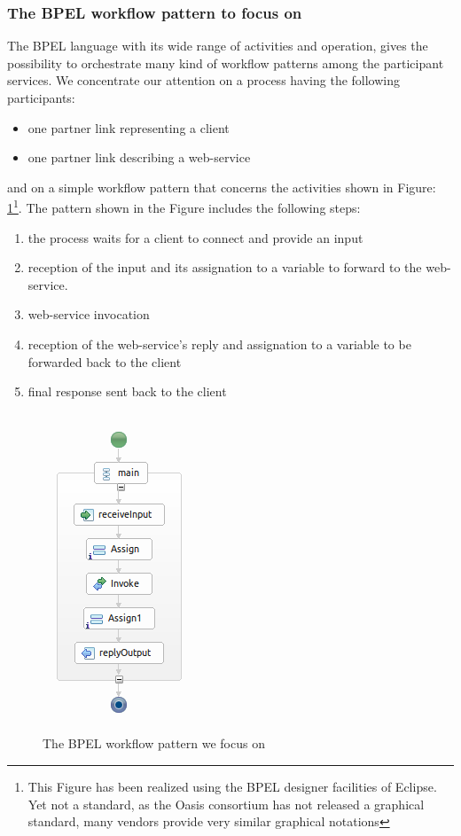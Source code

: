 \subsubsection{The BPEL workflow pattern to focus on}
\label{sec:DesignBPELPattern}
The BPEL language with its wide range of activities and operation, gives the possibility to orchestrate many kind of workflow patterns among the participant services. We concentrate our attention on a process having the following participants:
\begin{itemize}
 \item one partner link representing a client
 \item one partner link describing a web-service
\end{itemize}
and on a simple workflow pattern that concerns the activities shown in Figure: \ref{fig:BPELWorkflowPattern}\footnote{This Figure has been realized using the BPEL designer facilities of Eclipse. Yet not a standard, as the Oasis consortium has not released a graphical standard, many vendors provide very similar graphical notations}. The pattern shown in the Figure includes the following steps:
\begin{enumerate}
 \item the process waits for a client to connect and provide an input
\item reception of the input and its assignation to a variable to forward to the web-service.
\item web-service invocation
\item reception of the web-service's reply and assignation to a variable to be forwarded back to the client
\item final response sent back to the client
\end{enumerate}


\begin{figure}
  \begin{center}
    \includegraphics[scale=0.8]{pictures/BPELSimpleProcess.png}
    \caption{The BPEL workflow pattern we focus on}
    \label{fig:BPELWorkflowPattern}
  \end{center}
\end{figure} 

